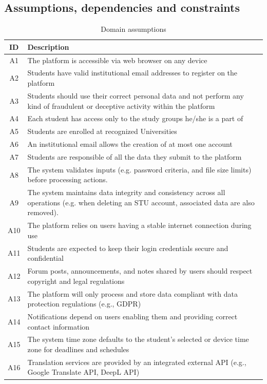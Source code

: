 \documentclass{article}
\begin{document}
\subsection{Assumptions, dependencies and constraints}
\begin{table}[h!]
\centering
\begin{tabular}{|c|p{15cm}|}
\hline
\textbf{ID} & \textbf{Description} \\
\hline
A1 & The platform is accessible via web browser on any device \\
A2 & Students have valid institutional email addresses to register on the platform \\
A3 & Students should use their correct personal data and not perform any kind of fraudulent or deceptive activity within the platform  \\
A4 & Each student has access only to the study groups he/she is a part of \\
A5 & Students are enrolled at recognized Universities \\
A6 & An institutional email allows the creation of at most one account \\
A7 & Students are responsible of all the data they submit to the platform \\
A8 & The system validates inputs (e.g. password criteria, and file size limits) before processing actions. \\
A9 & The system maintains data integrity and consistency across all operations (e.g. when deleting an STU account, associated data are also removed). \\
A10 & The platform relies on users having a stable internet connection during use \\
A11 & Students are expected to keep their login credentials secure and confidential \\
A12 & Forum posts, announcements, and notes shared by users should respect copyright and legal regulations \\
A13 & The platform will only process and store data compliant with data protection regulations (e.g., GDPR) \\
A14 & Notifications depend on users enabling them and providing correct contact information \\
A15 & The system time zone defaults to the student’s selected or device time zone for deadlines and schedules \\
A16 & Translation services are provided by an integrated external API (e.g., Google Translate API, DeepL API) \\
\hline
\end{tabular}
\caption{Domain assumptions}
\label{tab:esempio}
\end{table}
\end{document}
